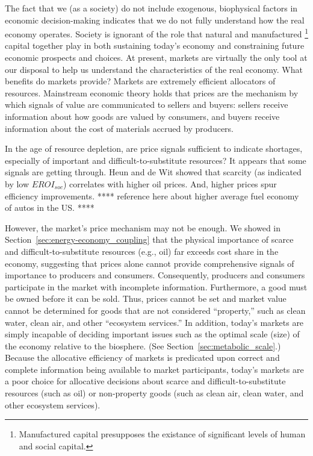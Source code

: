 The fact that we (as a society) do not include exogenous, biophysical factors 
in economic decision-making indicates that
we do not fully understand how the real economy operates.
Society is ignorant of the role that natural and manufactured%
	\footnote{
	Manufactured capital presupposes the existance of 
	significant levels of human and social capital.
	}
capital together play in both sustaining today's economy and 
constraining future economic prospects and choices.
At present, markets are virtually the only tool at our disposal
to help us understand the characteristics of the real economy.
What benefits do markets provide?
Markets are extremely efficient allocators of resources.
Mainstream economic theory holds that prices are the mechanism by which signals
of value are communicated to sellers and buyers:
sellers receive information about how goods are valued by consumers, and
buyers receive information about the cost of materials accrued by producers.

In the age of resource depletion, 
are price signals sufficient to indicate shortages, 
especially of important and difficult-to-substitute resources?
It appears that some signals are getting through.
Heun and de Wit
showed that scarcity (as indicated by low $EROI_{soc}$)
correlates with higher oil prices.\cite{Heun:2012ek}
And, higher prices spur efficiency improvements. 
**** reference here about higher average fuel economy of autos in the US. ****

However, the market's price mechanism may not be enough.
We showed in Section~\ref{sec:energy-economy_coupling}
that the physical importance 
of scarce and difficult-to-substitute resources (e.g., oil) 
far exceeds cost share in the economy,
suggesting that prices alone cannot provide comprehensive
signals of importance to producers and consumers.
Consequently, producers and consumers participate in the market with incomplete information.
Furthermore, a good must be owned before 
it can be sold.
Thus, prices cannot be set and market value cannot be determined
for goods that are not considered ``property,'' 
such as clean water, clean air, and other ``ecosystem services.''
In addition, today's markets are simply incapable of deciding
important issues such as the optimal scale (size) of the economy
relative to the biosphere. (See Section~\ref{sec:metabolic_scale}.)
Because the allocative efficiency of markets is predicated upon 
correct and complete information being available to market participants,
today's markets are a poor choice for allocative decisions about
scarce and difficult-to-substitute resources (such as oil)
or non-property goods (such as clean air, clean water, and other ecosystem services).

